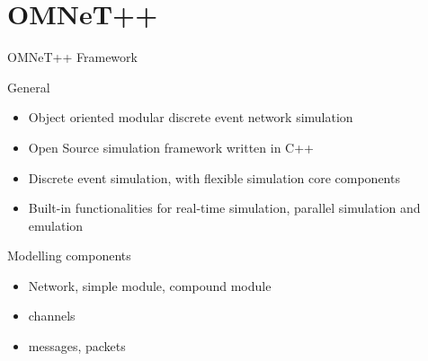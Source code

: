 \section{OMNeT++}

\begin{frame}{OMNeT++ Framework}
    \begin{block}{General}
        \begin{itemize}
            \item Object oriented modular discrete event network simulation
            \item Open Source simulation framework written in C++
            \item Discrete event simulation, with flexible simulation core components
            \item Built-in functionalities for real-time simulation, parallel simulation and emulation
        \end{itemize}
    \end{block}
    \begin{block}{Modelling components}
        \begin{itemize}
            \item Network, simple module, compound module
            \item channels
            \item messages, packets
        \end{itemize}
    \end{block}
\end{frame}
